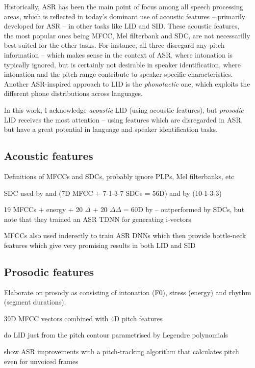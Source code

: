 \documentclass[bsc,frontabs,twoside,singlespacing,parskip,deptreport]{infthesis}
\begin{document}
{{    Historically, ASR has been the main point of focus among all speech processing areas, which is reflected in today's dominant use of acoustic features -- primarily developed for ASR -- in other tasks like LID and SID. These acoustic features, the most popular ones being MFCC, Mel filterbank and SDC, are not necessarilly best-suited for the other tasks. For instance, all three disregard any pitch information -- which makes sense in the context of ASR, where intonation is typically ignored, but is certainly not desirable in speaker identification, where intonation and the pitch range contribute to speaker-specific characteristics. Another ASR-inspired approach to LID is the \textit{phonotactic} one, which exploits the different phone distributions across languages.

    In this work, I acknowledge \textit{acoustic} LID (using acoustic features), but \textit{prosodic} LID receives the most attention -- using features which are disregarded in ASR, but have a great potential in language and speaker identification tasks.

    \subsection{Acoustic features}{
      \label{sec:acoustic-feats}
      Definitions of MFCCs and SDCs, probably ignore PLPs, Mel filterbanks, etc

      SDC used by \cite{Ferrer_et_al_2016} and \cite{Sarma_et_al_2018} (7D MFCC + 7-1-3-7 SDCs = 56D) and by \cite{Torres-Carrasquillo_et_al_2002} (10-1-3-3)

      19 MFCCs + energy + 20 $\Delta$ + 20 $\Delta\Delta$ = 60D by \cite{Sarma_et_al_2018} -- outperformed by SDCs, but note that they trained an ASR TDNN for generating i-vectors
      
      MFCCs also used inderectly to train ASR DNNs which then provide bottle-neck features which give very promising results in both LID and SID
    }
    \subsection{Prosodic features}{
      Elaborate on prosody as consisting of intonation (F0), stress (energy) and rhythm (segment durations).
      
      39D MFCC vectors combined with 4D pitch features \citep{Song_et_al_2013}

      \cite{Lin_et_al_2005} do LID just from the pitch contour parametrised by Legendre polynomials

      \cite{Ghahremani_et_al_2014} show ASR improvements with a pitch-tracking algorithm that calculates pitch even for unvoiced frames
    }
  }
}
\end{document}
